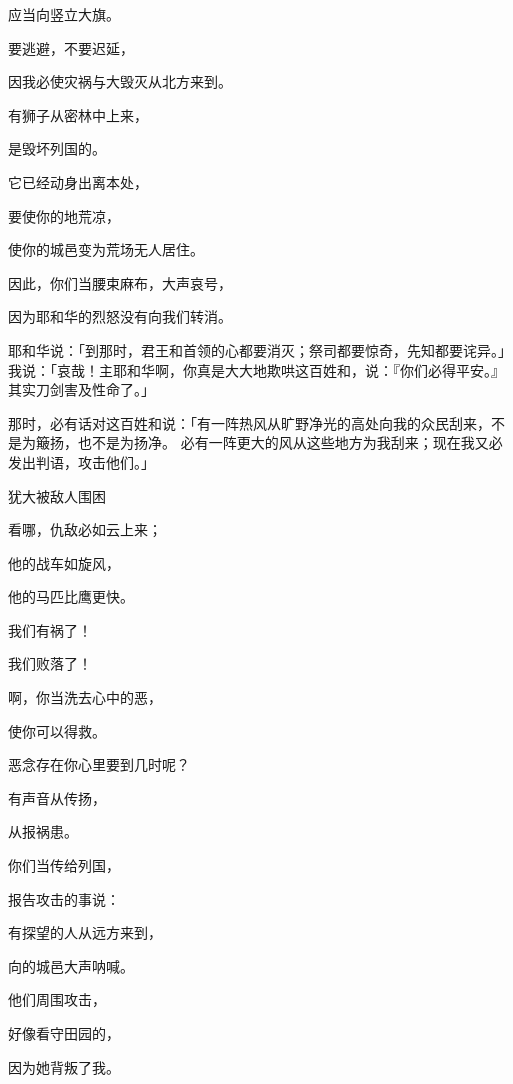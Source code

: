 {\par }{\Q {}应当向{}竖立大旗。
\par }{\Q 要逃避，不要迟延，
\par }{\Q 因我必使灾祸与大毁灭从北方来到。
\par }{\Q {}有狮子从密林中上来，
\par }{\Q 是毁坏列国的。
\par }{\Q 它已经动身出离本处，
\par }{\Q 要使你的地荒凉，
\par }{\Q 使你的城邑变为荒场无人居住。
\par }{\Q {}因此，你们当腰束麻布，大声哀号，
\par }{\Q 因为耶和华的烈怒没有向我们转消。
\par }{\PP {}耶和华说：「到那时，君王和首领的心都要消灭；祭司都要惊奇，先知都要诧异。」
我说：「哀哉！主耶和华啊，你真是大大地欺哄这百姓和{}，说：『你们必得平安。』其实刀剑害及性命了。」
\par }{\PP {}那时，必有话对这百姓和{}说：「有一阵热风从旷野净光的高处向我的众民刮来，不是为簸扬，也不是为扬净。
必有一阵更大的风从这些地方为我刮来；现在我又必发出判语，攻击他们。」
\par }{\SH 犹大被敌人围困
\par }{\Q {}看哪，仇敌必如云上来；
\par }{\Q 他的战车如旋风，
\par }{\Q 他的马匹比鹰更快。
\par }{\Q 我们有祸了！
\par }{\Q 我们败落了！
\par }{\Q {}啊，你当洗去心中的恶，
\par }{\Q 使你可以得救。
\par }{\Q 恶念存在你心里要到几时呢？
\par }{\Q {}有声音从{}传扬，
\par }{\Q 从{}报祸患。
\par }{\Q {}你们当传给列国，
\par }{\Q 报告攻击{}的事说：
\par }{\Q 有探望的人从远方来到，
\par }{\Q 向{}的城邑大声呐喊。
\par }{\Q {}他们周围攻击{}，
\par }{\Q 好像看守田园的，
\par }{\Q 因为她背叛了我。
}
